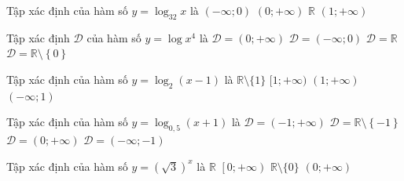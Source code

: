 \begin{ex}%
	Tập xác định của hàm số $y=\log_32x$  là
	\choice 
		 {$(-\infty;0)$}
		 {\True $(0;+\infty)$}
		{$\mathbb{R}$} 
		 {$(1;+\infty)$}
\end{ex}

\begin{ex}%
	Tập xác định $\mathscr{D}$  của hàm số $y=\log x^4$ là
	\choice 
		 {$\mathscr{D}=(0;+\infty)$}
		{$\mathscr{D}=(-\infty;0)$} 
		 {$\mathscr{D}=\mathbb{R}$}
		 {\True $\mathscr{D}=\mathbb{R}\setminus \left\{0\right\}$}
\end{ex}

\begin{ex}%
	Tập xác định  của hàm số $ y=\log_2(x-1)$ là
	\choice 
		{$\mathbb{R}\setminus\{1\}$} 
		{$[1;+\infty)$} 
		{\True  $(1;+\infty)$}
		{$(-\infty;1)$} 
\end{ex}

\begin{ex}%
	Tập  xác định của hàm số $y=\log_{0,5}(x+1)$ là
	\choice 
		{\True $\mathscr{D}=(-1;+\infty)$} 
		 {$\mathscr{D}=\mathbb{R}\setminus \left\{-1\right\}$}
		 {$\mathscr{D}=(0;+\infty)$}
		 {$\mathscr{D}=(-\infty;-1)$}
\end{ex}

\begin{ex}%
	Tập xác định của hàm số $y=\left(\sqrt{3}\right)^x$ là 
	\choice 
		{\True  $\mathbb{R}$}
		{$\left[0;+\infty\right)$} 
		{$\mathbb{R}\setminus  \{0\}$}
		{$(0;+\infty)$} 
\end{ex}

